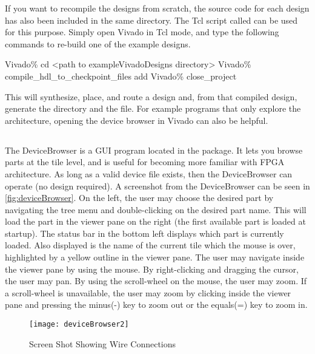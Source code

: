 If you want to recompile the designs from scratch, the source code for each
design has also been included in the same directory. The Tcl script called
 can be used for this purpose. Simply open Vivado in Tcl
mode, and type the following commands to re-build one of the example designs. 
                
\vspace{-0.15in}  \begin{code}
	Vivado\% cd <path to exampleVivadoDesigns directory>
	Vivado\% compile_hdl_to_checkpoint_files add
	Vivado\% close_project
\end{code}
This will synthesize, place, and route a design and, from that compiled
design, generate the  directory and the  file. For example
programs that only explore the architecture, opening the device browser in
Vivado can also be helpful.

\subsection{}
The DeviceBrowser is a GUI program located in the 
 package. It lets you browse
parts at the tile level, and is useful for becoming more familiar with FPGA
architecture. As long as a valid device file exists, then the DeviceBrowser can
operate (no design required). A screenshot from the DeviceBrowser can be seen in
\autoref{fig:deviceBrowser}. On the left, the user may choose the desired part
by navigating the tree menu and double-clicking on the desired part name.
This will load the part in the viewer pane on the right (the first available
part is loaded at startup). The status bar in the bottom left displays which
part is currently loaded. Also displayed is the name of the current tile
which the mouse is over, highlighted by a yellow outline in the viewer pane.
The user may navigate inside the viewer pane by using the mouse. By
right-clicking and dragging the cursor, the user may pan. By using the
scroll-wheel on the mouse, the user may zoom. If a scroll-wheel is
unavailable, the user may zoom by clicking inside the viewer pane and pressing
the minus(-) key to zoom out or the equals(=) key to zoom in.

\begin{figure}[htb]
\centering
\texttt{[image: deviceBrowser2]}
\caption{ Screen Shot Showing Wire Connections}
\label{fig:deviceBrowser2}
\end{figure}

